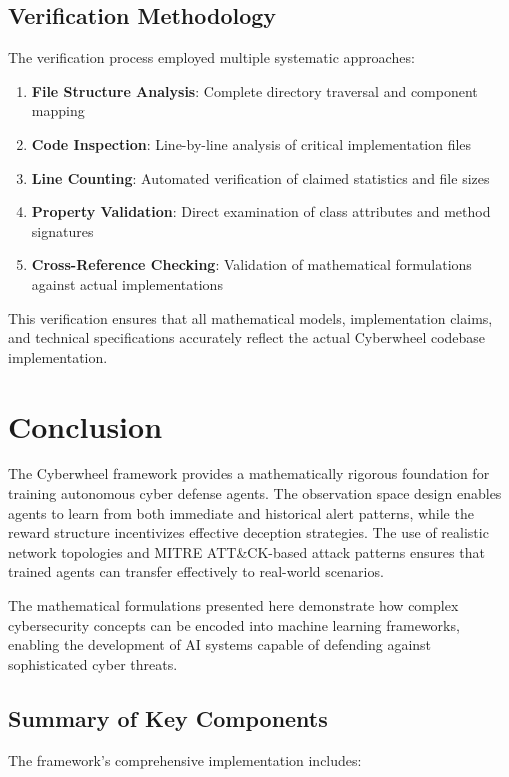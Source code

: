 \documentclass[12pt,a4paper]{article}
\begin{document}
\subsection{Verification Methodology}
The verification process employed multiple systematic approaches:
\begin{enumerate}
    \item \textbf{File Structure Analysis}: Complete directory traversal and component mapping
    \item \textbf{Code Inspection}: Line-by-line analysis of critical implementation files
    \item \textbf{Line Counting}: Automated verification of claimed statistics and file sizes
    \item \textbf{Property Validation}: Direct examination of class attributes and method signatures
    \item \textbf{Cross-Reference Checking}: Validation of mathematical formulations against actual implementations
\end{enumerate}

This verification ensures that all mathematical models, implementation claims, and technical specifications accurately reflect the actual Cyberwheel codebase implementation.

\section{Conclusion}

The Cyberwheel framework provides a mathematically rigorous foundation for training autonomous cyber defense agents. The observation space design enables agents to learn from both immediate and historical alert patterns, while the reward structure incentivizes effective deception strategies. The use of realistic network topologies and MITRE ATT\&CK-based attack patterns ensures that trained agents can transfer effectively to real-world scenarios.

The mathematical formulations presented here demonstrate how complex cybersecurity concepts can be encoded into machine learning frameworks, enabling the development of AI systems capable of defending against sophisticated cyber threats.

\subsection{Summary of Key Components}
The framework's comprehensive implementation includes:
\end{document}
